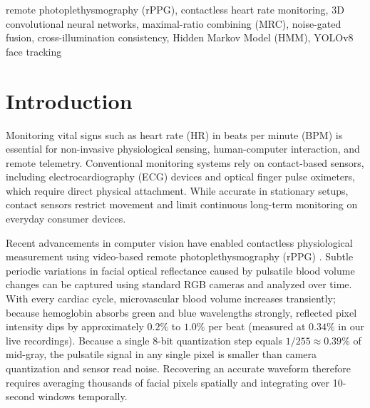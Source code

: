 \documentclass[conference]{IEEEtran}
\begin{document}
\begin{IEEEkeywords}
remote photoplethysmography (rPPG), contactless heart rate monitoring, 3D convolutional neural networks, maximal-ratio combining (MRC), noise-gated fusion, cross-illumination consistency, Hidden Markov Model (HMM), YOLOv8 face tracking
\end{IEEEkeywords}

\section{Introduction}
Monitoring vital signs such as heart rate (HR) in beats per minute (BPM) is essential for non-invasive physiological sensing, human-computer interaction, and remote telemetry. Conventional monitoring systems rely on contact-based sensors, including electrocardiography (ECG) devices and optical finger pulse oximeters, which require direct physical attachment. While accurate in stationary setups, contact sensors restrict movement and limit continuous long-term monitoring on everyday consumer devices.

Recent advancements in computer vision have enabled contactless physiological measurement using video-based remote photoplethysmography (rPPG) \cite{mcduff2015review, kumar2015distanceppg, dehaan2013chrom}. Subtle periodic variations in facial optical reflectance caused by pulsatile blood volume changes can be captured using standard RGB cameras and analyzed over time. With every cardiac cycle, microvascular blood volume increases transiently; because hemoglobin absorbs green and blue wavelengths strongly, reflected pixel intensity dips by approximately $0.2\%$ to $1.0\%$ per beat (measured at $0.34\%$ in our live recordings). Because a single 8-bit quantization step equals $1/255 \approx 0.39\%$ of mid-gray, the pulsatile signal in any single pixel is smaller than camera quantization and sensor read noise. Recovering an accurate waveform therefore requires averaging thousands of facial pixels spatially and integrating over 10-second windows temporally.
\end{document}
